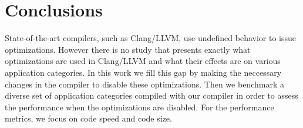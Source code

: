 \section{Conclusions} \label{sec:ccl}

State-of-the-art compilers, such as Clang/LLVM, use undefined behavior
to issue optimizations. However there is no study that presents exactly
what optimizations are used in Clang/LLVM and what their effects are on
various application categories. In this work we fill this gap by making
the neccessary changes in the compiler to disable these optimizations.
Then we benchmark a diverse set of application categories compiled with
our compiler in order to assess the performance when the optimizations
are disabled. For the performance metrics, we focus on code speed and
code size.

